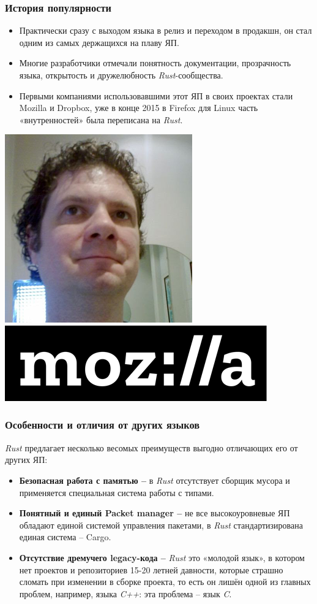 \documentclass[11pt]{beamer}
\begin{document}
\begin{frame}
\frametitle{История популярности}
\begin{itemize}
    \item Практически сразу с выходом языка в релиз и переходом в продакшн, он стал одним из самых держащихся на плаву ЯП. 
    \item Многие разработчики отмечали понятность документации, прозрачность языка, открытость и дружелюбность \textit{Rust}-сообщества.
    \item Первыми компаниями использовавшими этот ЯП в своих проектах стали Mozilla и Dropbox, уже в конце 2015 в Firefox для Linux часть «внутренностей» была переписана на \textit{Rust}.
\end{itemize}
\includegraphics[scale=0.6]{image.png}
\includegraphics[scale=0.6]{image2.png}
\centering
\end{frame}
\begin{frame}
\frametitle{Особенности и отличия от других языков}
\textit{Rust} предлагает несколько весомых преимуществ выгодно отличающих его от других ЯП:
\begin{itemize} 
    \item \textbf{Безопасная работа с памятью –} в \textit{Rust} отсутствует сборщик мусора и применяется специальная система работы с типами. 
    \item \textbf{Понятный и единый Packet manager –} не все высокоуровневые ЯП обладают единой системой управления пакетами, в \textit{Rust} стандартизирована единая система – {\color{orange}Cargo}.
    \item \textbf{Отсутствие дремучего legacy-кода –} \textit{Rust} это «молодой язык», в котором нет проектов и репозиториев 15-20 летней давности, которые страшно сломать при изменении в сборке проекта, то есть он лишён одной из главных проблем, например, языка \textit{C++}: эта проблема – язык \textit{C}.
\end{itemize}
\end{frame}
\end{document}
